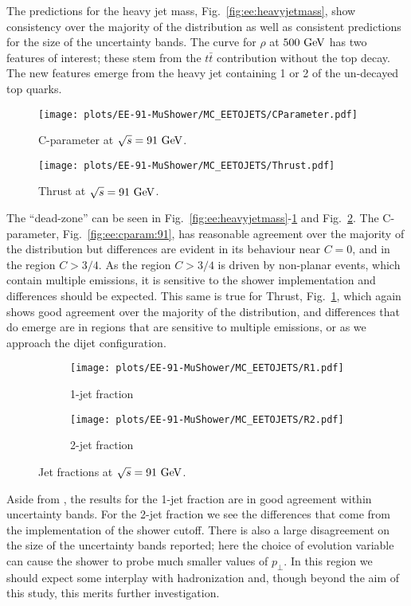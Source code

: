 The predictions for the heavy jet mass, Fig.~\ref{fig:ee:heavyjetmass}, show
consistency over the majority of the distribution as well as consistent
predictions for the size of the uncertainty bands.  The \Deductor curve for
$\rho$ at $500~\textrm{GeV}$ has two features of interest; these stem from the
$t\bar{t}$ contribution without the top decay. The new features emerge from
the heavy jet containing 1 or 2 of the un-decayed top quarks.

\begin{figure}[h]
  \centering
  \begin{minipage}[t]{0.49\textwidth}
    \texttt{[image: plots/EE-91-MuShower/MC\_EETOJETS/CParameter.pdf]}
    \caption{C-parameter at $\sqrt{s}=91~\textrm{GeV}$.}
    \label{fig:ee:cparam:91}
  \end{minipage}
  \begin{minipage}[t]{0.49\textwidth}
    \texttt{[image: plots/EE-91-MuShower/MC\_EETOJETS/Thrust.pdf]}
    \caption{Thrust at $\sqrt{s}=91~\textrm{GeV}$.}
	\label{fig:ee:thrust:91}
  \end{minipage}
\end{figure}

The \Herwig \QTilde ``dead-zone'' can be seen in 
Fig.~\ref{fig:ee:heavyjetmass}-\ref{fig:ee:thrust:91} and
Fig.~\ref{fig:ee:r1:91}.  The C-parameter, Fig.~\ref{fig:ee:cparam:91}, has
reasonable agreement over the majority of the distribution but differences are
evident in its behaviour near $C=0$, and in the region $C>3/4$. As the region
$C>3/4$ is driven by non-planar events, which contain multiple emissions, it
is sensitive to the shower implementation and differences should be expected.
This same is true for Thrust, Fig.~\ref{fig:ee:thrust:91}, which again shows
good agreement over the majority of the distribution, and differences that do
emerge are in regions that are sensitive to multiple emissions, or as we
approach the dijet configuration.
\begin{figure}[h]
  \centering
  \begin{subfigure}[t]{0.49\textwidth}
    \texttt{[image: plots/EE-91-MuShower/MC\_EETOJETS/R1.pdf]}
    \caption{1-jet fraction}
    \label{fig:ee:r1:91}
  \end{subfigure}
  \begin{subfigure}[t]{0.49\textwidth}
    \texttt{[image: plots/EE-91-MuShower/MC\_EETOJETS/R2.pdf]}
    \caption{2-jet fraction}
    \label{fig:ee:r2:91}
  \end{subfigure}
  \caption{Jet fractions at $\sqrt{s}=91~\textrm{GeV}$.}
  \label{fig:ee:r:91}
\end{figure}
Aside from \Herwig \QTilde, the results for the 1-jet fraction are in good
agreement within uncertainty bands. For the 2-jet fraction we see the
differences that come from the implementation of the shower cutoff. There is
also a large disagreement on the size of the uncertainty bands reported; here
the choice of evolution variable can cause the shower to probe much smaller
values of $p_\perp$. In this region we should expect some interplay with
hadronization and, though beyond the aim of this study, this merits further
investigation.

